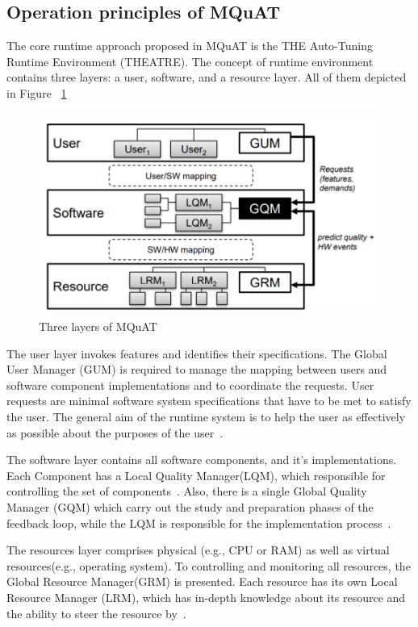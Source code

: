 \subsection{Operation principles of MQuAT}
The core runtime approach proposed in MQuAT is the THE Auto-Tuning Runtime Environment (THEATRE)\cite{gotz10, gotz12}.
The concept of runtime environment contains three layers: a user, software, and a resource layer. All of them depicted in Figure ~\ref{fig:threelayersmquat}
\begin{figure}
	\centering
	\includegraphics[width=\textwidth]{images/ThreeLayersMQuAT}
	\caption[Three layers of MQuAT]{Three layers of MQuAT}
	\label{fig:threelayersmquat}
\end{figure}

The user layer invokes features and identifies their specifications. The  Global  User  Manager  (GUM)  is required to manage the mapping between users and software component implementations and to coordinate the requests. User requests are minimal software system specifications that have to be met to satisfy the user. The general aim of the runtime system is to help the user as effectively as possible about the purposes of the user~\cite{gotz13}.

The software layer contains all software components, and it's implementations. Each Component has a Local Quality Manager(LQM), which responsible for controlling the set of components~\cite{gotz13, ahmad18}. Also, there is a single Global Quality Manager (GQM) which carry out the study and preparation phases of the feedback loop, while the LQM is responsible for the implementation process~\cite{gotz13}.

The resources layer comprises physical (e.g., CPU or RAM) as well as virtual resources(e.g., operating system).
To controlling and monitoring all resources, the Global Resource Manager(GRM) is presented. Each resource has its own Local Resource Manager (LRM), which has in-depth knowledge about its resource and the ability to steer the resource by~\cite{gotz13, ahmad18}.

